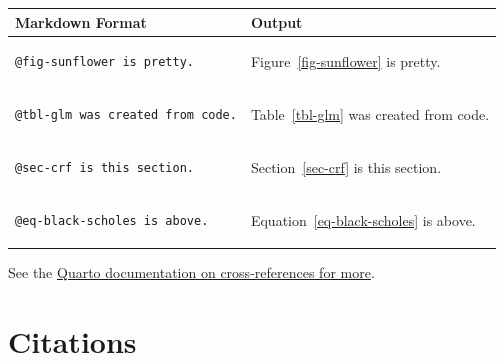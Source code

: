 \documentclass[
]{interact}
\newcounter{none} %
\begin{document}
{\def\LTcaptype{none} %
\begin{longtable}[]{@{}
  >{\raggedright\arraybackslash}p{}
  >{\raggedright\arraybackslash}p{}@{}}
\toprule\noalign{}
\begin{minipage}[b]{\linewidth}\raggedright
Markdown Format
\end{minipage} & \begin{minipage}[b]{\linewidth}\raggedright
Output
\end{minipage} \\
\midrule\noalign{}
\endhead
\bottomrule\noalign{}
\endlastfoot
\begin{minipage}[t]{\linewidth}\raggedright
\begin{verbatim}
@fig-sunflower is pretty.
\end{verbatim}
\end{minipage} & Figure~\ref{fig-sunflower} is pretty. \\
\begin{minipage}[t]{\linewidth}\raggedright
\begin{verbatim}
@tbl-glm was created from code.
\end{verbatim}
\end{minipage} & Table~\ref{tbl-glm} was created from code. \\
\begin{minipage}[t]{\linewidth}\raggedright
\begin{verbatim}
@sec-crf is this section.
\end{verbatim}
\end{minipage} & Section~\ref{sec-crf} is this section. \\
\begin{minipage}[t]{\linewidth}\raggedright
\begin{verbatim}
@eq-black-scholes is above.
\end{verbatim}
\end{minipage} & Equation~\ref{eq-black-scholes} is above. \\
\end{longtable}
}

See the
\href{https://quarto.org/docs/authoring/cross-references.html}{Quarto
documentation on cross-references for more}.

\section{Citations}\label{citations}
\end{document}
